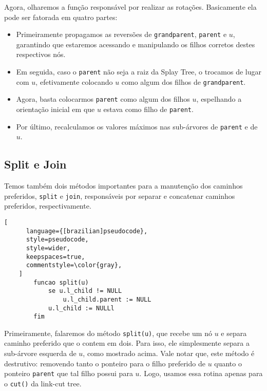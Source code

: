 Agora, olharemos a função responsável por realizar as rotações. Basicamente ela pode ser fatorada em quatro partes:

\begin{itemize}
    \item Primeiramente propagamos as reversões de \texttt{grandparent}, \texttt{parent} e $u$, garantindo que estaremos acessando e manipulando os filhos corretos destes respectivos nós.
    \item Em seguida, caso o \texttt{parent} não seja a raiz da Splay Tree, o trocamos  de lugar com $u$, efetivamente colocando $u$ como algum dos filhos de \texttt{grandparent}.
    \item Agora, basta colocarmos \texttt{parent} como algum dos filhos $u$, espelhando a orientação inicial em que $u$ estava como filho de \texttt{parent}.
    \item Por último, recalculamos os valores máximos nas sub-árvores de \texttt{parent} e de $u$.
\end{itemize}

\subsection{Split e Join}
\label{subsection:lct-splay-split-join}

Temos também dois métodos importantes para a manutenção dos caminhos preferidos, \texttt{split} e \texttt{join}, responsáveis por separar e concatenar caminhos preferidos, respectivamente.

\begin{programruledcaption}{\label{splay:split}}
    \begin{lstlisting}[
      language={[brazilian]pseudocode},
      style=pseudocode,
      style=wider,
      keepspaces=true,
      commentstyle=\color{gray},
    ]
        funcao split(u)
            se u.l_child != NULL
                u.l_child.parent := NULL    
            u.l_child := NULLl
        fim
    \end{lstlisting}
\end{programruledcaption}

Primeiramente, falaremos do método \texttt{split(u)}, que recebe um nó $u$ e separa caminho preferido que o contem em dois. Para isso, ele simplesmente separa a sub-árvore esquerda de $u$, como mostrado acima. Vale notar que, este método é destrutivo: removendo tanto o ponteiro para o filho preferido de $u$ quanto o ponteiro \texttt{parent} que tal filho possui para $u$. Logo, usamos essa rotina apenas para o \texttt{cut()} da link-cut tree.


